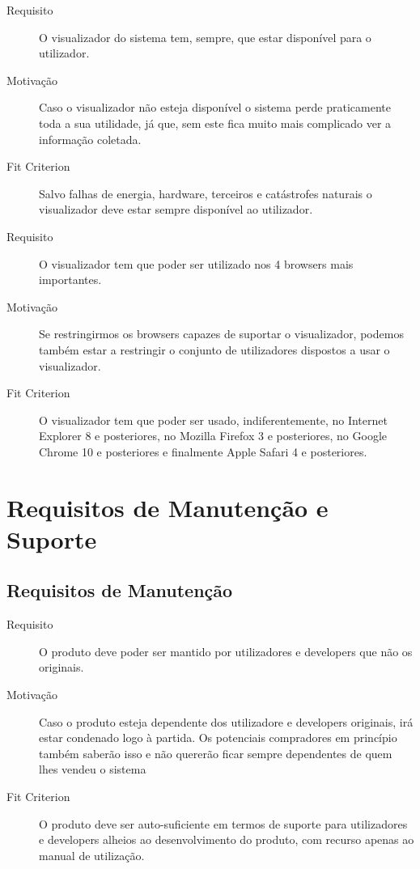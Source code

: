 \begin{description}
\item[Requisito] O visualizador do sistema tem, sempre, que estar disponível para o utilizador.
\item[Motivação] Caso o visualizador não esteja disponível o sistema perde praticamente toda a sua utilidade, já que, sem este fica muito mais 
complicado ver a informação coletada.
\item[Fit Criterion] Salvo falhas de energia, hardware, terceiros e catástrofes naturais o visualizador deve estar sempre disponível ao utilizador. 
\end{description}




\begin{description}
\item[Requisito] O visualizador tem que poder ser utilizado nos 4 browsers mais importantes.
\item[Motivação] Se restringirmos os browsers capazes de suportar o visualizador, podemos também estar a restringir 
o conjunto de utilizadores dispostos a usar o visualizador.
\item[Fit Criterion] O visualizador tem que poder ser usado, indiferentemente, no Internet Explorer 8 e posteriores, no Mozilla Firefox 3 e 
posteriores, no Google Chrome 10 e posteriores e finalmente Apple Safari 4 e posteriores.
\end{description}



\section{Requisitos de Manutenção e Suporte}
\subsection{Requisitos de Manutenção}
\begin{description}
\item[Requisito] O produto deve poder ser mantido por utilizadores e developers que não os originais.
\item[Motivação] Caso o produto esteja dependente dos utilizadore e developers originais, irá estar condenado logo à partida. Os potenciais 
compradores em princípio também saberão isso e não quererão ficar sempre dependentes de quem lhes vendeu o sistema
\item[Fit Criterion] O produto deve ser auto-suficiente em termos de suporte para utilizadores e developers alheios ao desenvolvimento 
do produto, com recurso apenas ao manual de utilização.
\end{description}

